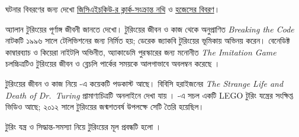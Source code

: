 \documentclass[../../../include/open-logic-section]{subfiles}
\begin{document}
\par\smallskip\noindent ঘটনার বিবরণের জন্য দেখো \href{https://www.gchq.gov.uk/information/joan-clarke}{জিসিএইচকিউ-র ক্লার্ক-সংক্রান্ত নথি} ও \href{https://www.turing.org.uk/scrapbook/ww2.html}{হজেসের বিবরণ}।

\begin{reading}
অ্যালান টুরিংয়ের পূর্ণাঙ্গ জীবনী
জানতে \citet{Hodges2014} দেখো।
টুরিংয়ের জীবন ও কাজ থেকে
অনুপ্রাণিত \emph{Breaking the Code}
নাটকটি ১৯৯৬ সালে টেলিভিশনের
জন্য নির্মিত হয়; ডেরেক জ্যাকবি
টুরিংয়ের ভূমিকায় অভিনয় করেন।
বেনেডিক্ট কাম্বারব্যাচ ও কিয়েরা
নাইটলি অভিনীত, অ্যাকাডেমি
পুরস্কারের জন্য মনোনীত
\emph{The Imitation Game}
চলচ্চিত্রটিও টুরিংয়ের জীবন ও
ব্লেচলি পার্কের সময়কে আলগাভাবে
অবলম্বন করেছে \citep{Imitation2014}।

টুরিংয়ের জীবন ও কাজ নিয়ে
\citet{Radiolab2012}-এ কয়েকটি
পডকাস্ট আছে। বিবিসি হরাইজনের
\emph{The Strange Life and Death of
Dr.~Turing} প্রামাণ্যচিত্রটি অনলাইনে
দেখা যায় \citep{Sykes1992}।
\citep{Theelen2012}-এ সচল একটি
LEGO টুরিং যন্ত্রের সংক্ষিপ্ত ভিডিও
আছে; ২০১২ সালে টুরিংয়ের জন্মশতবর্ষ
উপলক্ষে সেটি তৈরি হয়েছিল।

টুরিং যন্ত্র ও সিদ্ধান্ত-সমস্যা নিয়ে
টুরিংয়ের মূল প্রবন্ধটি হলো
\citet{Turing1937}।
\end{reading}
\end{document}
